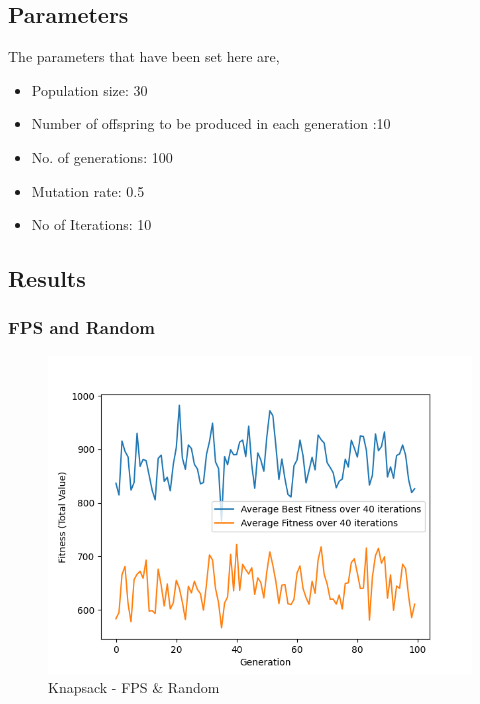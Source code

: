 \documentclass[11pt, letterpaper]{article}
\begin{document}
\subsection{Parameters}
The parameters that have been set here are,
\begin{itemize}
    \item Population size: 30
    \item Number of offspring to be produced in each generation :10
    \item No. of generations: 100
    \item Mutation rate: 0.5
    \item No of Iterations: 10
\end{itemize}
\subsection{Results} 
\subsubsection {FPS and Random}
\begin{figure}[H]
    \centering
    \includegraphics[scale = 0.6]{images/knapsack_fp_rd.png}
    \caption {Knapsack - FPS \& Random}
    \label {fig:kpFR}
\end{figure}
\end{document}
